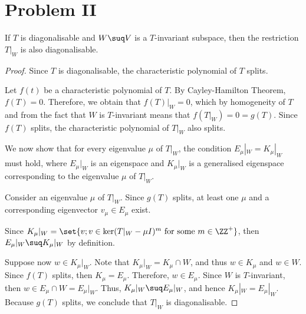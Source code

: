 \documentclass[11pt]{scrartcl}
\begin{document}
\section{Problem II}

\begin{lemma}
  If $T$ is diagonalisable and $W\suq V$ is a $T$-invariant subspace,
  then the restriction $T|_W$ is also diagonalisable.
\end{lemma}

\begin{proof}
  \hfill

  Since $T$ is diagonalisable, the characteristic polynomial of $T$
  splits.

  Let $f(t)$ be a characteristic polynomial of $T$. By Cayley-Hamilton
  Theorem, $f(T) = 0$. Therefore, we obtain that $f(T)|_W=0$, which by
  homogeneity of $T$ and from the fact that $W$ is $T$-invariant means
  that $f(T|_W) = 0 = g(T)$. Since $f(T)$ splits, the characteristic
  polynomial of $T|_W$ also splits.


  We now show that for every eigenvalue $\mu$ of $T|_W$, the condition
  $E_{\mu}|_W=K_{\mu}|_W$ must hold, where $E_{\mu}|_W$ is an
  eigenspace and $K_{\mu}|_W$ is a generalised eigenspace
  corresponding to the eigenvalue $\mu$ of $T|_W$.

  Consider an eigenvalue $\mu$ of $T|_W$. Since $g(T)$ splits, at
  least one $\mu$ and a corresponding eigenvector $v_{\mu}\in E_{\mu}$ exist.

  Since
  $K_{\mu}|_W=\set{v;v\in \ker (T|_W-\mu I)^m \text{ for some }
    m\in\ZZ^{+}}$, then $E_{\mu}|_W\suq K_{\mu}|_{W}$ by definition.

  Suppose now $w\in K_{\mu}|_W$. Note that
  $K_{\mu}|_W = K_{\mu}\cap W$, and thus $w\in K_{\mu}$ and $w\in
  W$. Since $f(T)$ splits, then $K_{\mu} = E_{\mu}$. Therefore,
  $w\in E_{\mu}$. Since $W$ is $T$-invariant, then
  $w\in E_{\mu}\cap W = E_{\mu}|_W$. Thus,
  $K_{\mu}|_W\suq E_{\mu}|_W$, and hence $K_{\mu}|_W =
  E_{\mu}|_W$. Because $g(T)$ splits, we conclude that $T|_W$ is
  diagonalisable.
  
\end{proof}
\end{document}
